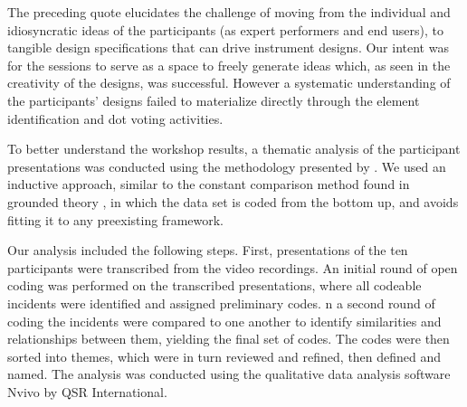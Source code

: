\documentclass[letterpaper, 12pt]{article}
\begin{document}
The preceding quote elucidates the challenge of moving from the individual and idiosyncratic ideas of the participants (as expert performers and end users), to tangible design specifications that can drive instrument designs. Our intent was for the sessions to serve as a space to freely generate ideas which, as seen in the creativity of the designs, was successful. However a systematic understanding of the participants' designs failed to materialize directly through the element identification and dot voting activities. 

To better understand the workshop results, a thematic analysis of the participant presentations was conducted using the methodology presented by \citet{Braun2006}. 
We used an inductive approach, similar to the constant comparison method found in grounded theory \citep{Strauss1994}, in which the data set is coded from the bottom up, and avoids fitting it to any preexisting framework.

Our analysis included the following steps. First, presentations of the ten participants were transcribed from the video recordings. An initial round of open coding was performed on the transcribed presentations, where all codeable incidents were identified and assigned preliminary codes. n a second round of coding the incidents were compared to one another to identify similarities and relationships between them, yielding the final set of codes. The codes were then sorted into themes, which were in turn reviewed and refined, then defined and named. The analysis was conducted using the qualitative data analysis software Nvivo by QSR International. 

\end{document}

